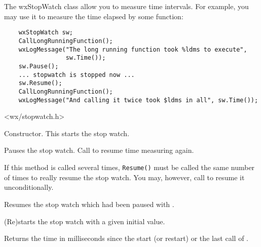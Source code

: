 \section{}\label{wxstopwatch}

The wxStopWatch class allow you to measure time intervals. For example, you may
use it to measure the time elapsed by some function:

\begin{verbatim}
    wxStopWatch sw;
    CallLongRunningFunction();
    wxLogMessage("The long running function took %ldms to execute",
                 sw.Time());
    sw.Pause();
    ... stopwatch is stopped now ...
    sw.Resume();
    CallLongRunningFunction();
    wxLogMessage("And calling it twice took $ldms in all", sw.Time());
\end{verbatim}


<wx/stopwatch.h>




\label{wxstopwatchctor}


Constructor. This starts the stop watch.

\label{wxstopwatchpause}


Pauses the stop watch. Call  to resume 
time measuring again.

If this method is called several times, {\tt Resume()} must be called the same
number of times to really resume the stop watch. You may, however, call 
 to resume it unconditionally.

\label{wxstopwatchresume}


Resumes the stop watch which had been paused with 
.

\label{wxstopwatchstart}


(Re)starts the stop watch with a given initial value.

\label{wxstopwatchtime}

\label{wxstopwatchtime}

Returns the time in milliseconds since the start (or restart) or the last call of 
.

